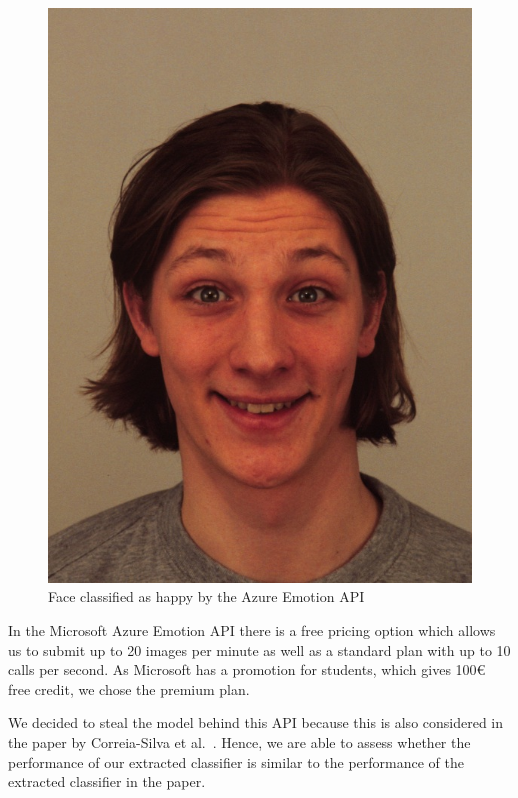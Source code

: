 \documentclass[a4paper,11pt]{article}
\begin{document}
            \begin{figure}[h!]
                    \centering      \includegraphics[scale=0.2]{exercise_3/paper/images/AM18HAS.JPG}
                    \caption{Face classified as happy by the Azure Emotion API}
                    \label{fig:happy_face}
            \end{figure}
        
        In the Microsoft Azure Emotion API there is a free pricing option which allows us to submit up to 20 images per minute as well as a standard plan with up to 10 calls per second. As Microsoft has a promotion for students, which gives 100€ free credit, we chose the premium plan. %
        
        We decided to steal the model behind this API because this is also considered in the paper by Correia-Silva et al.~\cite{copycat}. Hence, we are able to assess whether the performance of our extracted classifier is similar to the performance of the extracted classifier in the paper.
        
\end{document}
